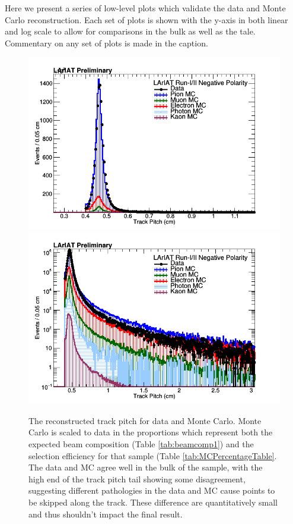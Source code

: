 Here we present a series of low-level plots which validate the data and Monte Carlo reconstruction. Each set of plots is shown with the y-axis in both linear and log scale to allow for comparisons in the bulk as well as the tale. Commentary on any set of plots is made in the caption.

\begin{figure}[h!]
\centering
\includegraphics[scale=0.33]{./images/TrackPitch.png}
\includegraphics[scale=0.33]{./images/TrackPitchLog.png}
\caption{The reconstructed track pitch for data and Monte Carlo. Monte Carlo is scaled to data in the proportions which represent both the expected beam composition (Table \ref{tab:beamcomp1}) and the selection efficiency for that sample (Table \ref{tab:MCPercentageTable}. The data and MC agree well in the bulk of the sample, with the high end of the track pitch tail showing some disagreement, suggesting different pathologies in the data and MC cause points to be skipped along the track. These difference are quantitatively small and thus shouldn't impact the final result. }
\label{fig:DataMCTrackPitch}
\end{figure}

